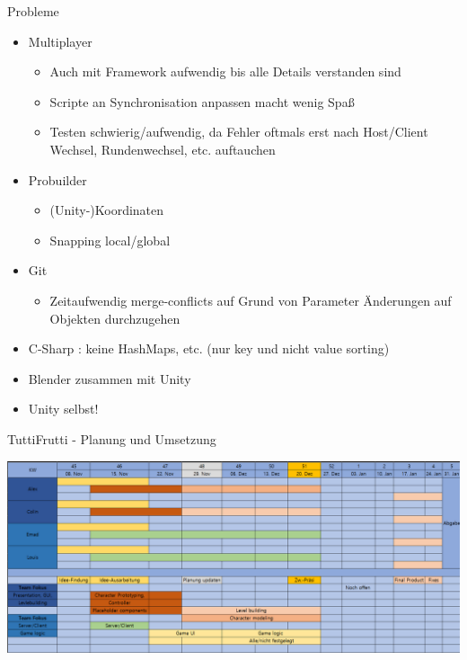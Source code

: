 \documentclass[xcolor=dvipsnames]{beamer}
\begin{document}
\begin{frame}{Probleme}
\begin{itemize}
 \item Multiplayer 
 	\begin{itemize}
 		\item Auch mit Framework aufwendig bis alle Details verstanden sind
 		\item Scripte an Synchronisation anpassen macht wenig Spaß
 		\item Testen schwierig/aufwendig, da Fehler oftmals erst nach Host/Client Wechsel, Rundenwechsel, etc. auftauchen
 	\end{itemize}
 \item Probuilder
 	\begin{itemize}
 		\item (Unity-)Koordinaten 
 		\item Snapping local/global
 	\end{itemize}
  \item Git
 	\begin{itemize}
 		\item Zeitaufwendig merge-conflicts auf Grund von Parameter Änderungen auf Objekten durchzugehen
 	\end{itemize}
  \item C-Sharp : keine HashMaps, etc. (nur key und nicht value sorting)
  \item Blender zusammen mit Unity 
  \item Unity selbst!
\end{itemize}
	
\end{frame}

\begin{frame}{TuttiFrutti - Planung und Umsetzung}
\begin{center}
		\includegraphics[width=1\textwidth]{ProjektPlanung_6times90.png}
\end{center}

\end{frame}
\end{document}
